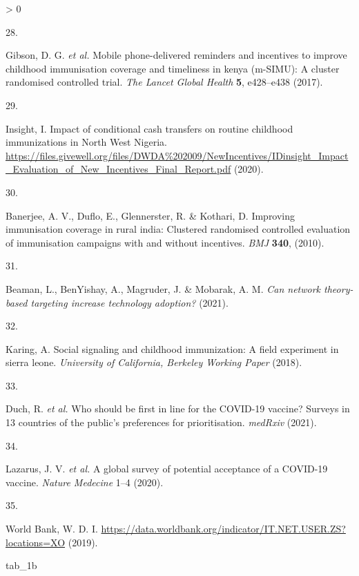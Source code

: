 \documentclass[
  12pt,
]{article}
\newenvironment{Shaded}{\begin{snugshade}}{\end{snugshade}}
\newcommand{\NormalTok}[1]{#1}
\newlength{\cslhangindent}
\newlength{\csllabelwidth}
\newenvironment{CSLReferences}[2] %
 {%
  \setlength{\parindent}{0pt}
  \ifodd #1 \everypar{\setlength{\hangindent}{\cslhangindent}}\ignorespaces\fi
  \ifnum #2 > 0
  \setlength{\parskip}{#2\baselineskip}
  \fi
 }%
 {}
\newcommand{\CSLLeftMargin}[1]{\parbox[t]{\csllabelwidth}{#1}}
\newcommand{\CSLRightInline}[1]{\parbox[t]{\linewidth - \csllabelwidth}{#1}\break}
\begin{document}
\begin{CSLReferences}{0}{0}
\leavevmode\hypertarget{ref-gibsonetal2017}{}%
\CSLLeftMargin{28. }
\CSLRightInline{Gibson, D. G. \emph{et al.} Mobile phone-delivered reminders and incentives to improve childhood immunisation coverage and timeliness in kenya (m-SIMU): A cluster randomised controlled trial. \emph{The Lancet Global Health} \textbf{5}, e428--e438 (2017).}

\leavevmode\hypertarget{ref-idinsight}{}%
\CSLLeftMargin{29. }
\CSLRightInline{Insight, I. {Impact of conditional cash transfers on routine childhood immunizations in North West Nigeria}. \url{https://files.givewell.org/files/DWDA\%202009/NewIncentives/IDinsight_Impact_Evaluation_of_New_Incentives_Final_Report.pdf} (2020).}

\leavevmode\hypertarget{ref-Banerjee2010}{}%
\CSLLeftMargin{30. }
\CSLRightInline{Banerjee, A. V., Duflo, E., Glennerster, R. \& Kothari, D. Improving immunisation coverage in rural india: Clustered randomised controlled evaluation of immunisation campaigns with and without incentives. \emph{BMJ} \textbf{340}, (2010).}

\leavevmode\hypertarget{ref-beaman2021can}{}%
\CSLLeftMargin{31. }
\CSLRightInline{Beaman, L., BenYishay, A., Magruder, J. \& Mobarak, A. M. \emph{Can network theory-based targeting increase technology adoption?} (2021).}

\leavevmode\hypertarget{ref-karing2018social}{}%
\CSLLeftMargin{32. }
\CSLRightInline{Karing, A. Social signaling and childhood immunization: A field experiment in sierra leone. \emph{University of California, Berkeley Working Paper} (2018).}

\leavevmode\hypertarget{ref-Duch2021}{}%
\CSLLeftMargin{33. }
\CSLRightInline{Duch, R. \emph{et al.} Who should be first in line for the COVID-19 vaccine? Surveys in 13 countries of the public{'}s preferences for prioritisation. \emph{medRxiv} (2021).}

\leavevmode\hypertarget{ref-lazarus2020nature}{}%
\CSLLeftMargin{34. }
\CSLRightInline{Lazarus, J. V. \emph{et al.} A global survey of potential acceptance of a COVID-19 vaccine. \emph{Nature Medecine} 1--4 (2020).}

\leavevmode\hypertarget{ref-wbinternet}{}%
\CSLLeftMargin{35. }
\CSLRightInline{World Bank, W. D. I. \url{https://data.worldbank.org/indicator/IT.NET.USER.ZS?locations=XO} (2019).}

\end{CSLReferences}

\newpage

\begin{Shaded}
\begin{Highlighting}[]
\NormalTok{tab\_1b}
\end{Highlighting}
\end{Shaded}
\end{document}
